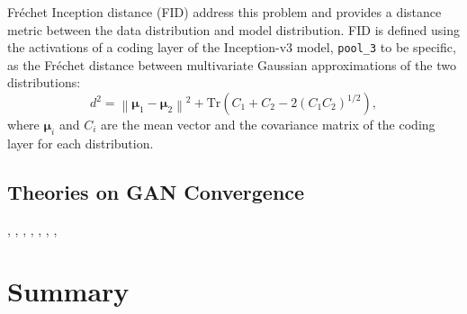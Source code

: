 Fréchet Inception distance (FID) \cite{heusel2017ttur} address this problem and provides a distance metric between the data distribution and model distribution.
FID is defined using the activations of a coding layer of the Inception-v3 model, \texttt{pool\_3} to be specific, as the Fréchet distance between multivariate Gaussian approximations of the two distributions:
\begin{equation}\label{eqn:fid}
d^2 = \left \lVert \bm{\mu}_1 - \bm{\mu}_2 \right \rVert^2 + \mathrm{Tr} \left ( C_1 + C_2 - 2 ( C_1 C_2 )^{1/2} \right ),
\end{equation}
where $\bm{\mu}_i$ and $C_i$ are the mean vector and the covariance matrix of the coding layer for each distribution.

\subsection{Theories on GAN Convergence}


\cite{arjovsky2017principled}, \cite{kodali2017gan}, \cite{nagarajan2017local}, \cite{daskalakis2018gan}, \cite{mohamed2016implicit}, \cite{fedus2018equilibrium}, \cite{arora2017gan,arora2018gan}, \cite{mescheder2017gan,mescheder2018convergence}

\section{Summary}

